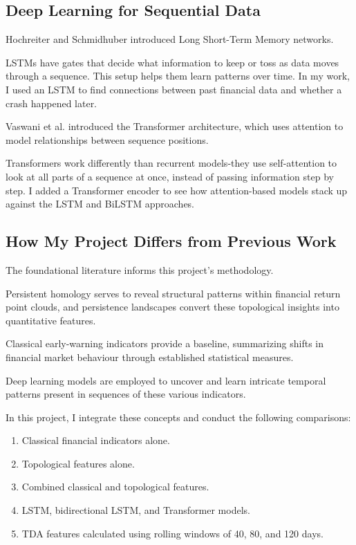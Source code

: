 \documentclass[oneside,english,11pt]{article}
\begin{document}
\subsection{Deep Learning for Sequential Data}

Hochreiter and Schmidhuber \citep{hochreiter1997} introduced Long Short-Term Memory networks.

LSTMs have gates that decide what information to keep or toss as data moves through a sequence. This setup helps them learn patterns over time.
In my work, I used an LSTM to find connections between past financial data and whether a crash happened later.


Vaswani et al. \citep{vaswani2017} introduced the Transformer architecture, which uses attention to model relationships between sequence positions.

Transformers work differently than recurrent models-they use self-attention to look at all parts of a sequence at once, instead of passing information step by step.
I added a Transformer encoder to see how attention-based models stack up against the LSTM and BiLSTM approaches.



\subsection{How My Project Differs from Previous Work}

The foundational literature informs this project's methodology. 

Persistent homology serves to reveal structural patterns within financial return point clouds, and persistence landscapes convert these topological insights into quantitative features.

Classical early-warning indicators provide a baseline, summarizing shifts in financial market behaviour through established statistical measures.

Deep learning models are employed to uncover and learn intricate temporal patterns present in sequences of these various indicators.

In this project, I integrate these concepts and conduct the following comparisons:

\begin{enumerate}

\item Classical financial indicators alone.

\item Topological features alone.

\item  Combined classical and topological features.

\item LSTM, bidirectional LSTM, and Transformer models.

\item TDA features calculated using rolling windows of 40, 80, and 120 days.

\end{enumerate}
\end{document}
